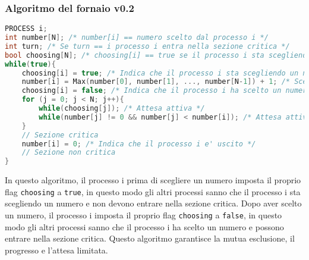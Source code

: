             \subsubsection{Algoritmo del fornaio v0.2}
\begin{lstlisting}[language=C++,basicstyle=\footnotesize]
PROCESS i;
int number[N]; /* number[i] == numero scelto dal processo i */
int turn; /* Se turn == i processo i entra nella sezione critica */
bool choosing[N]; /* choosing[i] == true se il processo i sta scegliendo un numero */
while(true){
    choosing[i] = true; /* Indica che il processo i sta scegliendo un numero */
    number[i] = Max(number[0], number[1], ..., number[N-1]) + 1; /* Sceglie un numero */
    choosing[i] = false; /* Indica che il processo i ha scelto un numero */
    for (j = 0; j < N; j++){
        while(choosing[j]); /* Attesa attiva */
        while(number[j] != 0 && number[j] < number[i]); /* Attesa attiva */
    }
    // Sezione critica
    number[i] = 0; /* Indica che il processo i e' uscito */
    // Sezione non critica
}
\end{lstlisting}
                In questo algoritmo, il processo i prima di scegliere un numero imposta il proprio flag \texttt{choosing} a \texttt{true}, in questo modo gli altri processi sanno che il processo i sta scegliendo un numero e non devono entrare nella sezione critica. Dopo aver scelto un numero, il processo i imposta il proprio flag \texttt{choosing} a \texttt{false}, in questo modo gli altri processi sanno che il processo i ha scelto un numero e possono entrare nella sezione critica. Questo algoritmo garantisce la mutua esclusione, il progresso e l'attesa limitata.

